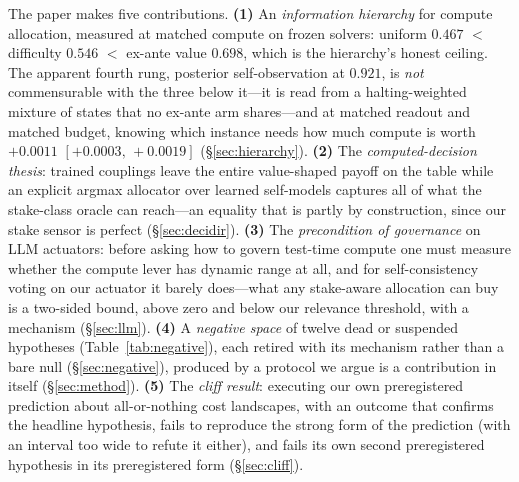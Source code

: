 \documentclass{article}
\newcommand{\Hun}{$0.467$}
\newcommand{\Hdif}{$0.546$}
\newcommand{\Hval}{$0.698$}
\newcommand{\Hpost}{$0.921$}
\newcommand{\Rasign}{$+0.0011$} \newcommand{\RasignIC}{$[+0.0003,\,+0.0019]$}
\begin{document}
The paper makes five contributions. \textbf{(1)} An \emph{information
hierarchy} for compute allocation, measured at matched compute on frozen
solvers: uniform \Hun{} $<$ difficulty \Hdif{} $<$ ex-ante value \Hval{},
which is the hierarchy's honest ceiling. The apparent fourth rung, posterior
self-observation at \Hpost{}, is \emph{not} commensurable with the three
below it---it is read from a halting-weighted mixture of states that no
ex-ante arm shares---and at matched readout and matched budget, knowing which
instance needs how much compute is worth \Rasign{} \RasignIC{}
(\S\ref{sec:hierarchy}). \textbf{(2)} The \emph{computed-decision
thesis}: trained couplings leave the entire value-shaped payoff on the table
while an explicit argmax allocator over learned self-models captures all of
what the stake-class oracle can reach---an equality that is partly by
construction, since our stake sensor is perfect (\S\ref{sec:decidir}). \textbf{(3)} The \emph{precondition of governance}
on LLM actuators: before asking how to govern test-time compute one must
measure whether the compute lever has dynamic range at all, and for
self-consistency voting on our actuator it barely does---what any stake-aware
allocation can buy is a two-sided bound, above zero and below our relevance
threshold, with a
mechanism (\S\ref{sec:llm}). \textbf{(4)} A \emph{negative space} of twelve
dead or suspended hypotheses (Table~\ref{tab:negative}), each retired with its
mechanism rather than a bare null
(\S\ref{sec:negative}), produced by a protocol we argue is a contribution in
itself (\S\ref{sec:method}). \textbf{(5)} The \emph{cliff result}: executing
our own preregistered prediction about all-or-nothing cost landscapes, with
an outcome that confirms the headline hypothesis, fails to reproduce the
strong form of the prediction (with an interval too wide to refute it
either), and fails its own second preregistered hypothesis in its
preregistered form (\S\ref{sec:cliff}).
\end{document}
